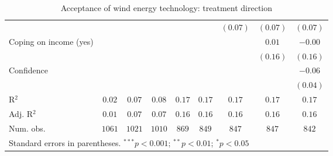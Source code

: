 \begin{table}[h]
\begin{center}
\begin{tabular}{l c c c c c c c c}
                                                                                &             &               &               &               &               & $(0.07)$      & $(0.07)$      & $(0.07)$      \\
Coping on income (yes)                                                          &             &               &               &               &               &               & $0.01$        & $-0.00$       \\
                                                                                &             &               &               &               &               &               & $(0.16)$      & $(0.16)$      \\
Confidence                                                                      &             &               &               &               &               &               &               & $-0.06$       \\
                                                                                &             &               &               &               &               &               &               & $(0.04)$      \\
\hline
R$^2$                                                                           & $0.02$      & $0.07$        & $0.08$        & $0.17$        & $0.17$        & $0.17$        & $0.17$        & $0.17$        \\
Adj. R$^2$                                                                      & $0.01$      & $0.07$        & $0.07$        & $0.16$        & $0.16$        & $0.16$        & $0.16$        & $0.16$        \\
Num. obs.                                                                       & $1061$      & $1021$        & $1010$        & $869$         & $849$         & $847$         & $847$         & $842$         \\
\hline
\multicolumn{9}{l}{\scriptsize{Standard errors in parentheses. $^{***}p<0.001$; $^{**}p<0.01$; $^{*}p<0.05$}}
\end{tabular}
\caption{Acceptance of wind energy technology: treatment direction}
\label{table:acceptance_wind_treatment_direction}
\end{center}
\end{table}
